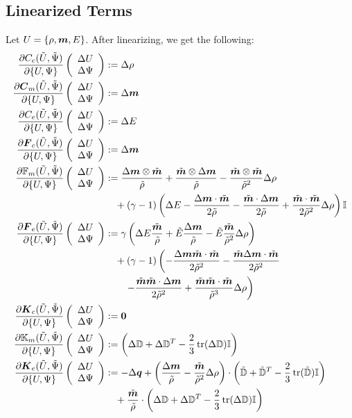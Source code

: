 \documentclass[Dissertation.tex]{subfiles}
\begin{document}
\subsection{Linearized Terms}
Let $U=\LRc{\rho,\bfm,E}$.
After linearizing, we get the following:
\begin{align*}
\pd{C_c(\tilde U,\tilde\Psi)}{\{U,\Psi\}}\vecttwo{\Delta U}{\Delta\Psi}&:=
	\Delta\rho\\
\pd{\bfC_m(\tilde U,\tilde\Psi)}{\{U,\Psi\}}\vecttwo{\Delta U}{\Delta\Psi}&:=
	\Delta\bfm\\
\pd{C_e(\tilde U,\tilde\Psi)}{\{U,\Psi\}}\vecttwo{\Delta U}{\Delta\Psi}&:=
	\Delta E\\
\pd{\bfF_c(\tilde U,\tilde\Psi)}{\{U,\Psi\}}\vecttwo{\Delta U}{\Delta\Psi}&:=
	\Delta\bfm\\
\pd{\mathbb{F}_m(\tilde U,\tilde\Psi)}{\{U,\Psi\}}\vecttwo{\Delta U}{\Delta\Psi}&:=
	\frac{\Delta\bfm\otimes\tilde\bfm}{\tilde\rho}
	+\frac{\tilde\bfm\otimes\Delta\bfm}{\tilde\rho}
	-\frac{\tilde\bfm\otimes\tilde\bfm}{\tilde\rho^2}\Delta\rho
	\\&\quad
	+(\gamma-1)\LRp{\Delta E
	-\frac{\Delta\bfm\cdot\tilde\bfm}{2\tilde\rho}
	-\frac{\tilde\bfm\cdot\Delta\bfm}{2\tilde\rho}
	+\frac{\tilde\bfm\cdot\tilde\bfm}{2\tilde\rho^2}\Delta\rho
	}\bbI\\
\pd{\bfF_e(\tilde U,\tilde\Psi)}{\{U,\Psi\}}\vecttwo{\Delta U}{\Delta\Psi}&:=
	\gamma\LRp{
	\Delta E\frac{\tilde\bfm}{\tilde\rho}
	+\tilde E\frac{\Delta\bfm}{\tilde\rho}
	-\tilde E\frac{\tilde\bfm}{\tilde\rho^2}\Delta\rho}
	\\&\quad
	+(\gamma-1)\left(
	-\frac{\Delta\bfm\tilde\bfm\cdot\tilde\bfm}{2\tilde\rho^2}
	-\frac{\tilde\bfm\Delta\bfm\cdot\tilde\bfm}{2\tilde\rho^2}
	\right.\\&\quad\quad\left.
	-\frac{\tilde\bfm\tilde\bfm\cdot\Delta\bfm}{2\tilde\rho^2}
	+\frac{\tilde\bfm\tilde\bfm\cdot\tilde\bfm}{\tilde\rho^3}\Delta\rho\right)\\
\pd{\bfK_c(\tilde U,\tilde\Psi)}{\{U,\Psi\}}\vecttwo{\Delta U}{\Delta\Psi}&:=
	\boldsymbol 0\\
\pd{\bbK_m(\tilde U,\tilde\Psi)}{\{U,\Psi\}}\vecttwo{\Delta U}{\Delta\Psi}&:=
	\LRp{\Delta\bbD+\Delta\bbD^T-\frac{2}{3}\trace(\Delta\bbD)\bbI}\\
\pd{\bfK_e(\tilde U,\tilde\Psi)}{\{U,\Psi\}}\vecttwo{\Delta U}{\Delta\Psi}&:=
	-\Delta\bfq+\LRp{\frac{\Delta\bfm}{\tilde\rho}-\frac{\tilde\bfm}{\tilde\rho^2}\Delta\rho}
	\cdot\LRp{\tilde\bbD+\tilde\bbD^T-\frac{2}{3}\trace(\tilde\bbD)\bbI}
	\\&\quad
	+\frac{\tilde\bfm}{\tilde\rho}\cdot\LRp{\Delta\bbD+\Delta\bbD^T-\frac{2}{3}\trace(\Delta\bbD)\bbI}\\
\end{align*}
\end{document}
